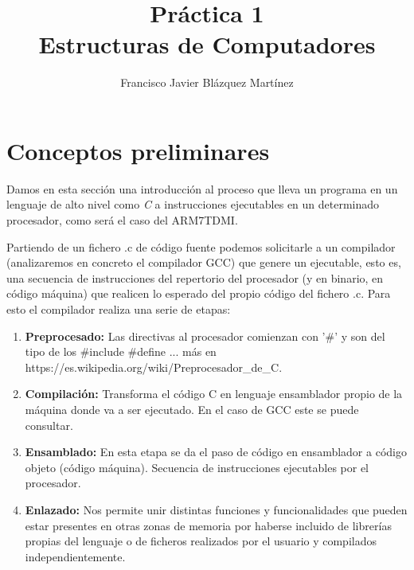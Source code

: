 \documentclass[12pt]{article}
\begin{document}
 
 
\title{\textbf{Práctica 1} \\ 
       \large Estructuras de Computadores}
\author{Francisco Javier Blázquez Martínez}
\maketitle

\setlength{\parskip}{\baselineskip}

\section{Conceptos preliminares}

Damos en esta sección una introducción al proceso que lleva un programa en un
lenguaje de alto nivel como \textit{C} a instrucciones ejecutables en un
determinado procesador, como será el caso del ARM7TDMI.

Partiendo de un fichero .c de código fuente podemos solicitarle a un compilador 
(analizaremos en concreto el compilador GCC) que genere un ejecutable, esto es,
una secuencia de instrucciones del repertorio del procesador (y en binario, en
código máquina) que realicen lo esperado del propio código del fichero .c. Para esto el compilador realiza una serie de etapas:

\begin{enumerate}
    \item \textbf{Preprocesado:} 
    Las directivas al procesador comienzan con '\#' y son del tipo de los
    \#include \#define ... más en https://es.wikipedia.org/wiki/Preprocesador\_de\_C.
    
    \item \textbf{Compilación:}
    Transforma el código C en lenguaje ensamblador propio de la máquina donde va a 
    ser ejecutado. En el caso de GCC este se puede consultar.
    
    \item \textbf{Ensamblado:}
    En esta etapa se da el paso de código en ensamblador a código objeto (código
    máquina). Secuencia de instrucciones ejecutables por el procesador.
          
    \item \textbf{Enlazado:}
    Nos permite unir distintas funciones y funcionalidades que pueden estar presentes
    en otras zonas de memoria por haberse incluido de librerías propias del lenguaje
    o de ficheros realizados por el usuario y compilados independientemente.
    
\end{enumerate}
\end{document}
